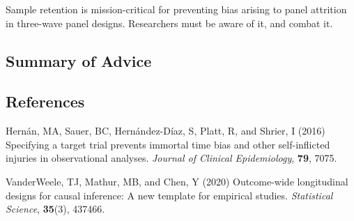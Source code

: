 \documentclass[
  singlecolumn,
  9pt]{article}
\newlength{\cslhangindent}
\newenvironment{CSLReferences}[2] %
 {\begin{list}{}{%
  \setlength{\itemindent}{0pt}
  \setlength{\leftmargin}{0pt}
  \setlength{\parsep}{0pt}
  \ifodd #1
   \setlength{\leftmargin}{\cslhangindent}
   \setlength{\itemindent}{-1\cslhangindent}
  \fi
  \setlength{\itemsep}{#2\baselineskip}}}
 {\end{list}}
\begin{document}
Sample retention is mission-critical for preventing bias arising to
panel attrition in three-wave panel designs. Researchers must be aware
of it, and combat it.

\subsection{Summary of Advice}\label{summary-of-advice}

\subsection*{References}\label{references}

\label{refs}
\begin{CSLReferences}{1}{0}
Hernán, MA, Sauer, BC, Hernández-Díaz, S, Platt, R, and Shrier, I (2016)
Specifying a target trial prevents immortal time bias and other
self-inflicted injuries in observational analyses. \emph{Journal of
Clinical Epidemiology}, \textbf{79}, 7075.

VanderWeele, TJ, Mathur, MB, and Chen, Y (2020) Outcome-wide
longitudinal designs for causal inference: A new template for empirical
studies. \emph{Statistical Science}, \textbf{35}(3), 437466.

\end{CSLReferences}
\end{document}

